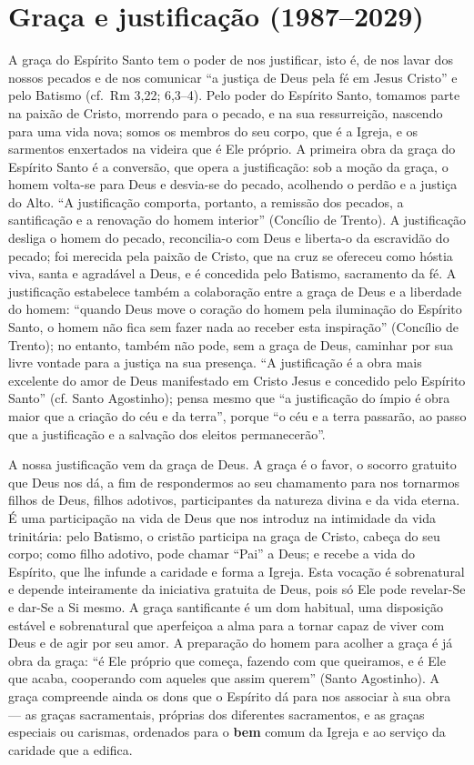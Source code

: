 \section{Graça e justificação (1987--2029)}

A graça do Espírito Santo tem o poder de nos justificar, isto é, de nos lavar dos nossos pecados e de nos comunicar ``a justiça de Deus pela fé em Jesus Cristo'' e pelo Batismo (cf.~Rm 3,22; 6,3--4). Pelo poder do Espírito Santo, tomamos parte na paixão de Cristo, morrendo para o pecado, e na sua ressurreição, nascendo para uma vida nova; somos os membros do seu corpo, que é a Igreja, e os sarmentos enxertados na videira que é Ele próprio. A primeira obra da graça do Espírito Santo é a conversão, que opera a justificação: sob a moção da graça, o homem volta-se para Deus e desvia-se do pecado, acolhendo o perdão e a justiça do Alto. ``A justificação comporta, portanto, a remissão dos pecados, a santificação e a renovação do homem interior'' (Concílio de Trento). A justificação desliga o homem do pecado, reconcilia-o com Deus e liberta-o da escravidão do pecado; foi merecida pela paixão de Cristo, que na cruz se ofereceu como hóstia viva, santa e agradável a Deus, e é concedida pelo Batismo, sacramento da fé. A justificação estabelece também a colaboração entre a graça de Deus e a liberdade do homem: ``quando Deus move o coração do homem pela iluminação do Espírito Santo, o homem não fica sem fazer nada ao receber esta inspiração'' (Concílio de Trento); no entanto, também não pode, sem a graça de Deus, caminhar por sua livre vontade para a justiça na sua presença. ``A justificação é a obra mais excelente do amor de Deus manifestado em Cristo Jesus e concedido pelo Espírito Santo'' (cf. Santo Agostinho); pensa mesmo que ``a justificação do ímpio é obra maior que a criação do céu e da terra'', porque ``o céu e a terra passarão, ao passo que a justificação e a salvação dos eleitos permanecerão''.

A nossa justificação vem da graça de Deus. A graça é o favor, o socorro gratuito que Deus nos dá, a fim de respondermos ao seu chamamento para nos tornarmos filhos de Deus, filhos adotivos, participantes da natureza divina e da vida eterna. É uma participação na vida de Deus que nos introduz na intimidade da vida trinitária: pelo Batismo, o cristão participa na graça de Cristo, cabeça do seu corpo; como filho adotivo, pode chamar ``Pai'' a Deus; e recebe a vida do Espírito, que lhe infunde a caridade e forma a Igreja. Esta vocação é sobrenatural e depende inteiramente da iniciativa gratuita de Deus, pois só Ele pode revelar-Se e dar-Se a Si mesmo. A graça santificante é um dom habitual, uma disposição estável e sobrenatural que aperfeiçoa a alma para a tornar capaz de viver com Deus e de agir por seu amor. A preparação do homem para acolher a graça é já obra da graça: ``é Ele próprio que começa, fazendo com que queiramos, e é Ele que acaba, cooperando com aqueles que assim querem'' (Santo Agostinho). A graça compreende ainda os dons que o Espírito dá para nos associar à sua obra --- as graças sacramentais, próprias dos diferentes sacramentos, e as graças especiais ou carismas, ordenados para o \textbf{bem} comum da Igreja e ao serviço da caridade que a edifica.

